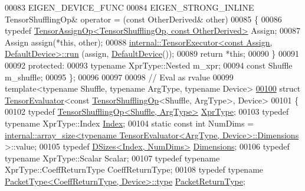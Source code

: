 \begin{DoxyCode}
00083     EIGEN\_DEVICE\_FUNC
00084     EIGEN\_STRONG\_INLINE TensorShufflingOp& operator = (\textcolor{keyword}{const} OtherDerived& other)
00085     \{
00086       \textcolor{keyword}{typedef} \hyperlink{class_eigen_1_1_tensor_assign_op}{TensorAssignOp<TensorShufflingOp, const OtherDerived>}
       Assign;
00087       Assign assign(*\textcolor{keyword}{this}, other);
00088       \hyperlink{class_eigen_1_1internal_1_1_tensor_executor}{internal::TensorExecutor<const Assign, DefaultDevice>::run}
      (assign, \hyperlink{struct_eigen_1_1_default_device}{DefaultDevice}());
00089       \textcolor{keywordflow}{return} *\textcolor{keyword}{this};
00090     \}
00091 
00092   \textcolor{keyword}{protected}:
00093     \textcolor{keyword}{typename} XprType::Nested m\_xpr;
00094     \textcolor{keyword}{const} Shuffle m\_shuffle;
00095 \};
00096 
00097 
00098 \textcolor{comment}{// Eval as rvalue}
00099 \textcolor{keyword}{template}<\textcolor{keyword}{typename} Shuffle, \textcolor{keyword}{typename} ArgType, \textcolor{keyword}{typename} Device>
\hyperlink{struct_eigen_1_1_tensor_evaluator_3_01const_01_tensor_shuffling_op_3_01_shuffle_00_01_arg_type_01_4_00_01_device_01_4}{00100} \textcolor{keyword}{struct }\hyperlink{struct_eigen_1_1_tensor_evaluator}{TensorEvaluator}<const \hyperlink{class_eigen_1_1_tensor_shuffling_op}{TensorShufflingOp}<Shuffle, ArgType>, Device>
00101 \{
00102   \textcolor{keyword}{typedef} \hyperlink{class_eigen_1_1_tensor_shuffling_op}{TensorShufflingOp<Shuffle, ArgType>} 
      \hyperlink{class_eigen_1_1_tensor_shuffling_op}{XprType};
00103   \textcolor{keyword}{typedef} \textcolor{keyword}{typename} XprType::Index \hyperlink{namespace_eigen_a62e77e0933482dafde8fe197d9a2cfde}{Index};
00104   \textcolor{keyword}{static} \textcolor{keyword}{const} \textcolor{keywordtype}{int} NumDims = 
      \hyperlink{struct_eigen_1_1internal_1_1array__size}{internal::array\_size<typename TensorEvaluator<ArgType, Device>::Dimensions}
      >::value;
00105   \textcolor{keyword}{typedef} \hyperlink{struct_eigen_1_1_d_sizes}{DSizes<Index, NumDims>} \hyperlink{struct_eigen_1_1_d_sizes}{Dimensions};
00106   \textcolor{keyword}{typedef} \textcolor{keyword}{typename} XprType::Scalar Scalar;
00107   \textcolor{keyword}{typedef} \textcolor{keyword}{typename} XprType::CoeffReturnType CoeffReturnType;
00108   \textcolor{keyword}{typedef} \textcolor{keyword}{typename} \hyperlink{group___sparse_core___module}{PacketType<CoeffReturnType, Device>::type} 
      \hyperlink{group___sparse_core___module}{PacketReturnType};

\end{DoxyCode}
